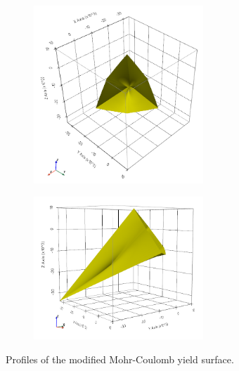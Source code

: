 \begin{figure}[htbp!]
  \begin{subfigure}[t]{0.5\textwidth}
    \centering
    \includegraphics[width=0.7\textwidth]{Figs/mohr_coulomb/MC_sheng_octahedral.png}
  \end{subfigure}
  \begin{subfigure}[t]{0.5\textwidth}
    \centering
    \includegraphics[width=0.7\textwidth]{Figs/mohr_coulomb/MC_sheng_3D.png}
  \end{subfigure}
  \caption{Profiles of the modified Mohr-Coulomb yield surface.}
  \label{fig:MC_Sheng}
\end{figure}
 
